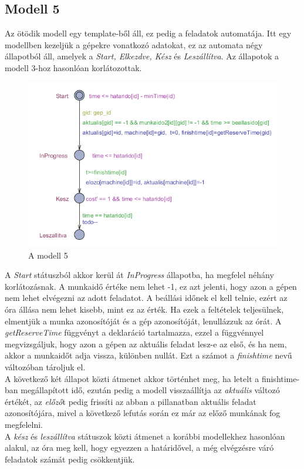 \documentclass [12pt]{report}
\begin{document}
\subsection{Modell 5}
Az ötödik modell egy template-ből áll, ez pedig a feladatok automatája. Itt egy modellben kezeljük a gépekre vonatkozó adatokat, ez az automata négy állapotból áll, amelyek a \emph{Start, Elkezdve, Kész} és \emph{Leszállítva}. Az állapotok a modell 3-hoz hasonlóan korlátozottak.\\
\begin{figure}[htpb]
\begin{center}
\includegraphics[height=6.5 cm]{modell_5}
\caption{A modell 5}
\end{center}
\end{figure}
 A \emph{Start} státuszból akkor kerül át \emph{InProgress} állapotba, ha megfelel néhány korlátozásnak. A munkaidő értéke nem lehet -1, ez azt jelenti, hogy azon a gépen nem lehet elvégezni az adott feladatot. A beállási időnek el kell telnie, ezért az óra állása nem lehet kisebb, mint ez az érték. Ha ezek a feltételek teljesülnek, elmentjük a munka azonosítóját és a gép azonosítóját, lenullázzuk az órát. A \emph{getReserveTime} függvényt a deklaráció tartalmazza, ezzel a függvénnyel megvizsgáljuk, hogy azon a gépen az aktuális feladat lesz-e az első, és ha nem, akkor a munkaidőt adja vissza, különben nullát. Ezt a számot a \emph{finishtime} nevű változóban tároljuk el.\\
 A következő két állapot közti átmenet akkor történhet meg, ha letelt a finishtime-ban megállapított idő, ezután pedig a modell visszaállítja az \emph{aktuális} változó értékét, az \emph{előző}t pedig frissíti az abban a pillanatban aktuális feladat azonosítójára, mivel a következő lefutás során ez már az előző munkának fog megfelelni. \\
 A \emph{kész} és \emph{leszállítva} státuszok közti átmenet a korábbi modellekhez hasonlóan alakul, az óra meg kell, hogy egyezzen a határidővel, a még elvégzésre váró feladatok számát pedig csökkentjük.
\end{document}
